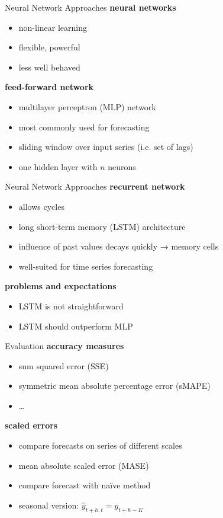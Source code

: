 \documentclass{beamer}
\begin{document}
  
  \begin{frame}{Neural Network Approaches}
    \textbf{neural networks}
    \begin{itemize}
     \item non-linear learning
     \item flexible, powerful
     \item less well behaved
    \end{itemize}
    
    \textbf{feed-forward network}
    \begin{itemize}
     \item multilayer perceptron (MLP) network 
     \item most commonly used for forecasting
     \item sliding window over input series (i.e. set of lags)
     \item one hidden layer with \(n\) neurons
    \end{itemize}
  \end{frame}

  
  \begin{frame}{Neural Network Approaches}
    \textbf{recurrent network}
    \begin{itemize}
     \item allows cycles
     \item long short-term memory (LSTM) architecture
     \item influence of past values decays quickly → memory cells
     \item well-suited for time series forecasting
    \end{itemize}
    
    \textbf{problems and expectations}
    \begin{itemize}
     \item LSTM is not straightforward
     \item LSTM should outperform MLP
    \end{itemize}
  \end{frame}

  
  \begin{frame}{Evaluation}
    \textbf{accuracy measures}
    \begin{itemize}
     \item sum squared error (SSE)
     \item symmetric mean absolute percentage error (sMAPE)
     \item \ldots
    \end{itemize}
   
    \textbf{scaled errors}
    \begin{itemize}
     \item compare forecasts on series of different scales 
     \item mean absolute scaled error (MASE)
     \item compare forecast with naïve method 
     \item seasonal version: \(\hat{y}_{t+h,t} = y_{t+h-K}\) %
    \end{itemize}
  \end{frame}

  
  
\end{document}
